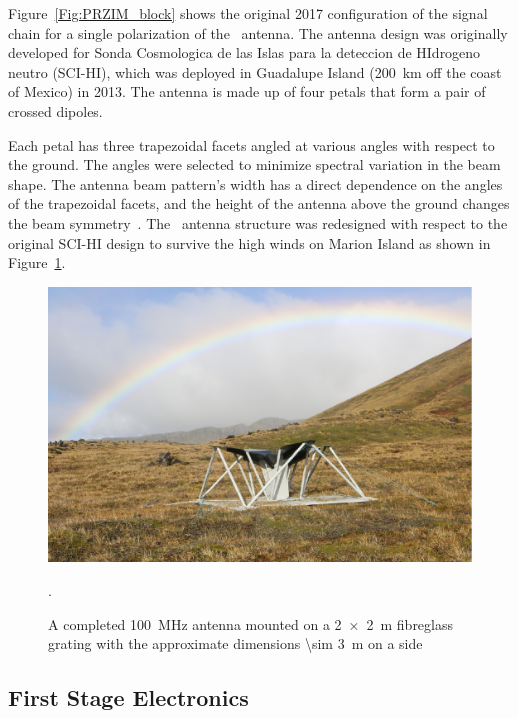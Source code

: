 Figure~\ref{Fig:PRZIM_block} shows the original 2017 configuration of the signal chain for a single polarization of the \prizm\ antenna. The  antenna design was originally developed for Sonda Cosmologica de las Islas para la deteccion de HIdrogeno neutro (SCI-HI), which was deployed in Guadalupe Island (\SI{200}{\kilo \meter} off the coast of Mexico) in 2013. The antenna is made up of four petals that form a pair of crossed dipoles. 

Each petal has three trapezoidal facets angled at various angles with respect to the ground. The angles were selected to minimize spectral variation in the beam shape. The antenna beam pattern's width has a direct dependence on the angles of the trapezoidal facets, and the height of the antenna above the ground changes the beam symmetry~\citep{2014ApJ...782L...9V}.  The \prizm\ antenna structure was redesigned with respect to the original SCI-HI design to survive the high winds on Marion Island as shown in Figure~\ref{Fig:tel}.  


\begin{figure}
\centering
\includegraphics[width=\linewidth]{Figures/tel}
\caption{A completed \SI{100}{\mega \hertz} antenna mounted on a \SI{2x2}{\meter} fibreglass grating with the approximate dimensions \SI{\sim 3}{\meter} on a side}.
\label{Fig:tel}
\end{figure}

\subsection{First Stage Electronics}

